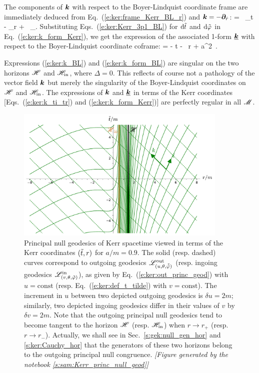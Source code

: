 The components of $\bm{k}$ with respect to the Boyer-Lindquist coordinate frame
are immediately deduced from Eq.~(\ref{e:ker:frame_Kerr_BL_r})
and $\bm{k} = - \bm{\partial}_{\hat{r}}$:
\be \label{e:ker:k_BL}
     =  \, \wpar_t
        - \wpar_r +  \, \wpar_\ph .
\ee
Substituting Eqs.~(\ref{e:ker:Kerr_3p1_BL}) for $\mathrm{d}{\tilde t}$ and $\mathrm{d}{\tilde\varphi}$ in
Eq.~(\ref{e:ker:k_form_Kerr}), we get the expression of the associated 1-form
$\underline{\bm{k}}$ with respect to the Boyer-Lindquist coordinate coframe:
\be \label{e:ker:k_form_BL}
     = - \dd t - \, \dd r + a\sin^2\th \, \dd \ph .
\ee
\begin{remark}
Expressions (\ref{e:ker:k_BL}) and (\ref{e:ker:k_form_BL}) are singular
on the two horizons $\mathscr{H}$ and $\mathscr{H}_{\rm in}$, where $\Delta = 0$. This reflects
of course not a pathology of the vector field $\bm{k}$ but merely the
singularity of the Boyer-Lindquist
coordinates on $\mathscr{H}$ and $\mathscr{H}_{\rm in}$. The expressions of $\bm{k}$ and
$\underline{\bm{k}}$ in terms of the Kerr coordinates [Eqs.~(\ref{e:ker:k_ti_tr})
and (\ref{e:ker:k_form_Kerr})] are perfectly regular in all $\mathscr{M}$.
\end{remark}


\begin{figure}
\centerline{\includegraphics[width=0.9\textwidth]{ker_princ_null_geod_a90.pdf}}
\caption[]{\label{f:ker:princ_null_geod_a90} \footnotesize
Principal null geodesics of Kerr spacetime viewed in terms of the Kerr
coordinates $({\tilde t},r)$ for $a/m=0.9$. The solid (resp. dashed) curves
correspond to outgoing geodesics $\mathscr{L}^{\rm out}_{(u,\theta,\tilde{{\tilde\varphi}})}$
(resp. ingoing geodesics $\mathscr{L}^{\rm in}_{(v,\theta,{\tilde\varphi})}$), as given by
Eq.~(\ref{e:ker:out_princ_geod}) with $u=\mathrm{const}$
(resp. Eq.~(\ref{e:ker:def_t_tilde}) with $v=\mathrm{const}$). The increment
in $u$ between two depicted outgoing geodesics is $\delta u = 2m$;
similarly, two depicted ingoing geodesics differ in their values of
$v$ by $\delta v = 2m$. Note that the outgoing principal null geodesics
tend to become tangent to the horizon $\mathscr{H}$ (resp. $\mathscr{H}_{\rm in}$) when
$r\to r_+$ (resp. $r\to r_-$). Actually, we shall see in
Sec.~\ref{s:gek:null_gen_hor} and \ref{s:ker:Cauchy_hor}
that the generators of these two horizons belong to the outgoing principal null
congruence.
\textsl{[Figure generated by the notebook \ref{s:sam:Kerr_princ_null_geod}]}
}
\end{figure}

